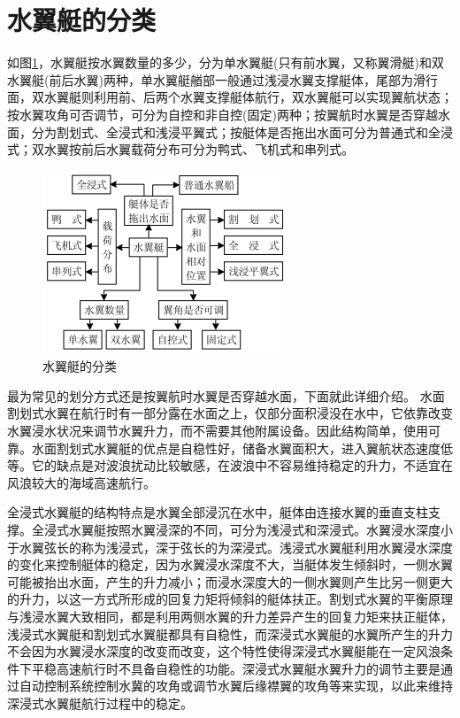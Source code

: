 \documentclass[10.5pt,twocolumn]{jbuaa}
\begin{document}
\section{水翼艇的分类}
如图\ref{fig:class}，水翼艇按水翼数量的多少，分为单水翼艇(只有前水翼，又称翼滑艇)和双水翼艇(前后水翼)两种，单水翼艇艏部一般通过浅浸水翼支撑艇体，尾部为滑行面，双水翼艇则利用前、后两个水翼支撑艇体航行，双水翼艇可以实现翼航状态；按水翼攻角可否调节，可分为自控和非自控(固定)两种；按翼航时水翼是否穿越水面，分为割划式、全浸式和浅浸平翼式；按艇体是否拖出水面可分为普通式和全浸式；双水翼按前后水翼载荷分布可分为鸭式、飞机式和串列式。
\begin{figure}
	\centering
	\includegraphics[scale=1,trim=0 0 0 0]{image/class}
	\caption{水翼艇的分类}
	\label{fig:class}
\end{figure}

最为常见的划分方式还是按翼航时水翼是否穿越水面，下面就此详细介绍。
水面割划式水翼在航行时有一部分露在水面之上，仅部分面积浸没在水中，它依靠改变水翼浸水状况来调节水翼升力，而不需要其他附属设备。因此结构简单，使用可靠。水面割划式水翼艇的优点是自稳性好，储备水翼面积大，进入翼航状态速度低等。它的缺点是对波浪扰动比较敏感，在波浪中不容易维持稳定的升力，不适宜在风浪较大的海域高速航行。

全浸式水翼艇的结构特点是水翼全部浸沉在水中，艇体由连接水翼的垂直支柱支撑。全浸式水翼艇按照水翼浸深的不同，可分为浅浸式和深浸式。水翼浸水深度小于水翼弦长的称为浅浸式，深于弦长的为深浸式。浅浸式水翼艇利用水翼浸水深度的变化来控制艇体的稳定，因为水翼浸水深度不大，当艇体发生倾斜时，一侧水翼可能被抬出水面，产生的升力减小；而浸水深度大的一侧水翼则产生比另一侧更大的升力，以这一方式所形成的回复力矩将倾斜的艇体扶正。割划式水翼的平衡原理与浅浸水翼大致相同，都是利用两侧水翼的升力差异产生的回复力矩来扶正艇体，浅浸式水翼艇和割划式水翼艇都具有自稳性，而深浸式水翼艇的水翼所产生的升力不会因为水翼浸水深度的改变而改变，这个特性使得深浸式水翼艇能在一定风浪条件下平稳高速航行时不具备自稳性的功能。深浸式水翼艇水翼升力的调节主要是通过自动控制系统控制水冀的攻角或调节水翼后缘襟翼的攻角等来实现，以此来维持深浸式水翼艇航行过程中的稳定。
\end{document}
